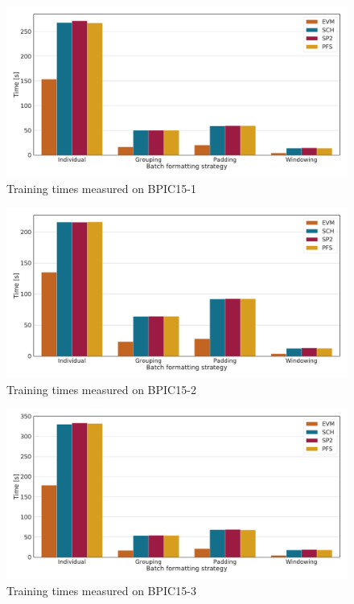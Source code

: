 \begin{figure}[!htb]
    \centering
    \includegraphics[width=\textwidth]{gfx/bpic2015_1/train_timings.pdf}
    \caption{Training times measured on BPIC15-1}
    \label{fig:BPIC15-1-training-timings}
\end{figure}
\begin{figure}[!htb]
    \centering
    \includegraphics[width=\textwidth]{gfx/bpic2015_2/train_timings.pdf}
    \caption{Training times measured on BPIC15-2}
    \label{fig:BPIC15-2-training-timings}
\end{figure}
\begin{figure}[!htb]
    \centering
    \includegraphics[width=\textwidth]{gfx/bpic2015_3/train_timings.pdf}
    \caption{Training times measured on BPIC15-3}
    \label{fig:BPIC15-3-training-timings}
\end{figure}
